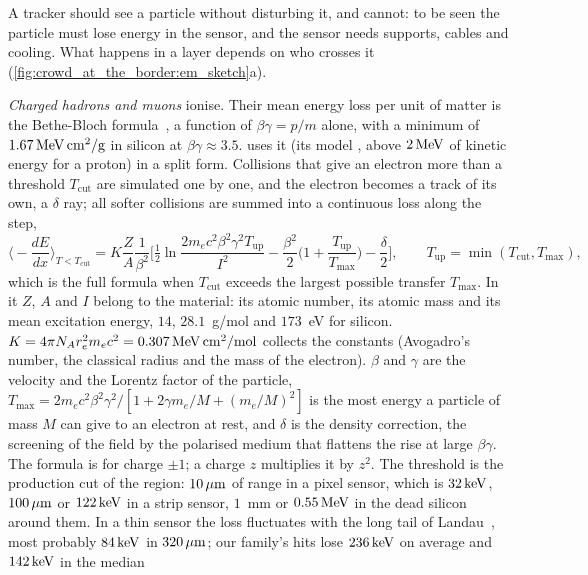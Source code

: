 A tracker should see a particle without disturbing it, and cannot: to be
seen the particle must lose energy in the sensor, and the sensor needs
supports, cables and cooling. What happens in a layer depends on who
crosses it (\cref{fig:crowd_at_the_border:em_sketch}a).

\emph{Charged hadrons and muons} ionise. Their mean energy loss per unit of
matter is the Bethe-Bloch formula~\cite{ParticleDataGroup:2024cfk}, a
function of $\beta\gamma=p/m$ alone, with a minimum of
$1.67\,\mathrm{MeV}\,\mathrm{cm^2/g}$ in silicon at $\beta\gamma\approx3.5$. \GEANT
uses it (its model , above $2\,\mathrm{MeV}$ of kinetic energy for a
proton) in a split form. Collisions that give an electron more than a
threshold $T_{\mathrm{cut}}$ are simulated one by one, and the electron
becomes a track of its own, a $\delta$ ray; all softer collisions are
summed into a continuous loss along the step,
\begin{equation}
  \Big\langle-\frac{dE}{dx}\Big\rangle_{T<T_{\mathrm{cut}}} = K\frac{Z}{A}\frac{1}{\beta^2}
  \Big[\tfrac12\ln\frac{2m_ec^2\beta^2\gamma^2T_{\mathrm{up}}}{I^2}
  -\frac{\beta^2}{2}\Big(1+\frac{T_{\mathrm{up}}}{T_{\max}}\Big)-\frac{\delta}{2}\Big],
  \qquad T_{\mathrm{up}}=\min(T_{\mathrm{cut}},T_{\max}),
  \label{eq:crowd_at_the_border:bethe}
\end{equation}
which is the full formula when $T_{\mathrm{cut}}$ exceeds the largest
possible transfer $T_{\max}$. In it $Z$, $A$ and $I$ belong to the
material: its atomic number, its atomic mass and its mean excitation
energy, $14$, $28.1$~g/mol and $173$~eV for silicon. $K=4\pi N_A r_e^2
m_ec^2=0.307\,\mathrm{MeV}\,\mathrm{cm^2/mol}$ collects the constants (Avogadro's
number, the classical radius and the mass of the electron). $\beta$ and
$\gamma$ are the velocity and the Lorentz factor of the particle,
$T_{\max}=2m_ec^2\beta^2\gamma^2/[1+2\gamma m_e/M+(m_e/M)^2]$ is the most
energy a particle of mass $M$ can give to an electron at rest, and $\delta$
is the density correction, the screening of the field by the polarised
medium that flattens the rise at large $\beta\gamma$. The formula is
for charge $\pm1$; a charge $z$ multiplies it by $z^2$. The threshold is the production cut of the
region: $10\,\mu\mathrm{m}$ of range in a pixel sensor, which is $32\,\mathrm{keV}$, $100\,\mu\mathrm{m}$ or
$122\,\mathrm{keV}$ in a strip sensor, $1$~mm or $0.55\,\mathrm{MeV}$ in the dead silicon
around them. In a thin sensor the loss fluctuates with the long tail of
Landau~\cite{Landau:1944if,Bichsel:1988if}, most probably $84\,\mathrm{keV}$ in
$320\,\mu\mathrm{m}$; our family's hits lose $236\,\mathrm{keV}$ on
average and $142\,\mathrm{keV}$ in the median
